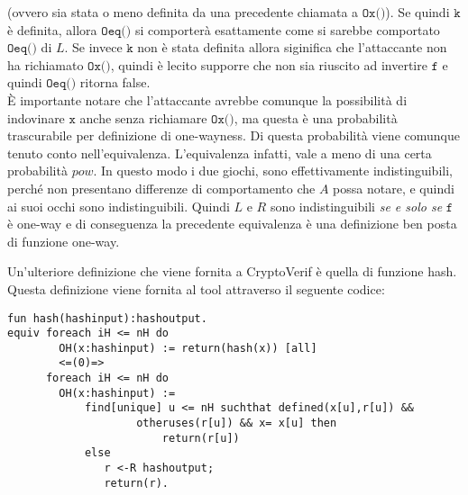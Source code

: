 \documentclass[a4paper,openright,twoside,12pt]{report}
\begin{document}
(ovvero sia stata o meno definita da una precedente chiamata a $\texttt{Ox()}$). Se quindi $\texttt{k}$ \`e definita, allora $\texttt{Oeq()}$ si comporter\`a esattamente come si sarebbe comportato $\texttt{Oeq()}$  di $L$.
Se invece $\texttt{k}$ non \`e stata definita allora siginifica che l'attaccante non ha richiamato $\texttt{Ox()}$, quindi \`e lecito supporre che non sia riuscito ad invertire $\texttt{f}$ e quindi $\texttt{Oeq()}$ ritorna false.\\
\`E importante notare che l'attaccante avrebbe comunque la possibilit\`a di indovinare $\texttt{x}$ anche senza richiamare $\texttt{Ox()}$, ma questa \`e una probabilit\`a trascurabile per definizione di one-wayness. 
Di questa probabilit\`a viene comunque tenuto conto nell'equivalenza. L'equivalenza infatti, vale a meno di una certa probabilit\`a $pow$.
In questo modo i due giochi, sono effettivamente indistinguibili, perch\'e non presentano differenze di comportamento che $A$ possa notare, e quindi ai suoi occhi sono indistinguibili.
Quindi $L$ e $R$ sono indistinguibili \emph{se e solo se} $\texttt{f}$ \`e one-way e di conseguenza la precedente equivalenza \`e una definizione ben posta di funzione one-way.

Un'ulteriore definizione che viene fornita a CryptoVerif \`e quella di funzione hash. Questa definizione viene fornita al tool attraverso il seguente codice:
\begin{verbatim}
fun hash(hashinput):hashoutput.
equiv foreach iH <= nH do 
        OH(x:hashinput) := return(hash(x)) [all]
        <=(0)=>
      foreach iH <= nH do 
        OH(x:hashinput) :=
            find[unique] u <= nH suchthat defined(x[u],r[u]) && 
                    otheruses(r[u]) && x= x[u] then 
                        return(r[u]) 
            else 
               r <-R hashoutput; 
               return(r).
\end{verbatim}
\end{document}
